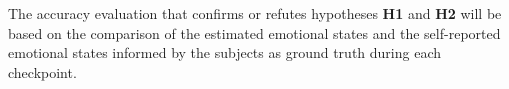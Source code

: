 The accuracy evaluation that confirms or refutes hypotheses \textbf{H1} and \textbf{H2} will be based on the comparison of the estimated emotional states and the self-reported emotional states informed by the subjects as ground truth during each checkpoint.





